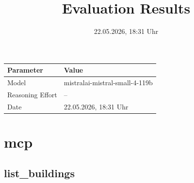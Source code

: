 \documentclass[a4paper,11pt]{article}
\title{Evaluation Results}
\date{22.05.2026, 18:31 Uhr}
\begin{document}
\maketitle

\begin{table}[H]
\centering
\begin{tabular}{l l}
\toprule
\textbf{Parameter} & \textbf{Value} \\
\midrule
Model & mistralai-mistral-small-4-119b \\
Reasoning Effort & -- \\
Date & 22.05.2026, 18:31 Uhr \\
\bottomrule
\end{tabular}
\end{table}

\tableofcontents
\clearpage

\section{mcp}

\subsection{list\_buildings}
\end{document}
